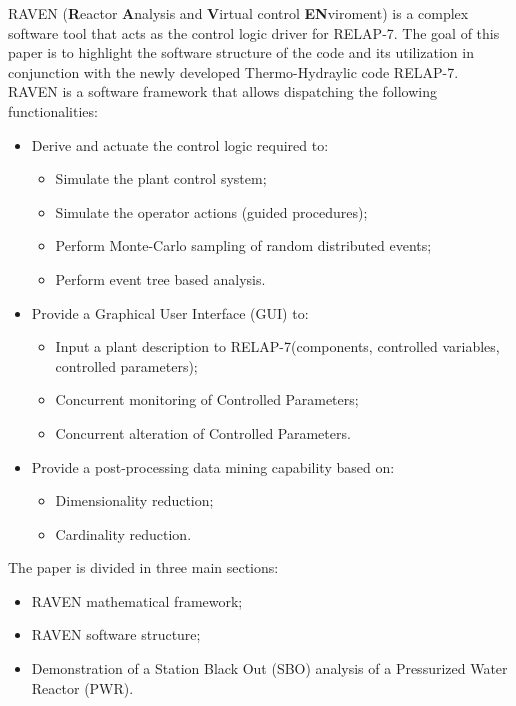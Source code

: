 \documentclass{mc2013}
\begin{document}
RAVEN (\textbf{R}eactor \textbf{A}nalysis and \textbf{V}irtual control \textbf{EN}viroment) is a complex software tool that acts as the control logic driver for RELAP-7. The goal of this paper is to highlight the software structure of the code and its utilization in conjunction with the newly developed Thermo-Hydraylic code RELAP-7. RAVEN is a software framework that allows dispatching the following functionalities:
\begin{itemize}
\item Derive and actuate the control logic required to:
\begin{itemize}
\item Simulate the plant control system;
\item Simulate the operator actions (guided procedures);
\item Perform Monte-Carlo sampling of random distributed events;
\item Perform event tree based analysis.
\end{itemize}
\item Provide a Graphical User Interface (GUI) to:
\begin{itemize}
\item Input a plant description to RELAP-7(components, controlled variables, controlled
parameters);
\item Concurrent monitoring of Controlled Parameters;
\item Concurrent alteration of Controlled Parameters.
\end{itemize}
\item Provide a post-processing data mining capability based on:
\begin{itemize}
\item Dimensionality reduction;
\item Cardinality reduction.
\end{itemize}
\end{itemize}
The paper is divided in three main sections:
\begin{itemize}
\item RAVEN mathematical framework;
\item RAVEN software structure;
\item Demonstration of a Station Black Out (SBO) analysis of a Pressurized Water Reactor (PWR).
\end{itemize}

\label{sec:mathFramework}
\end{document}
